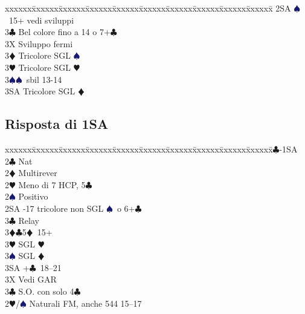 \documentclass[a4paper,italian]{article}
\newcommand{\BC}{\textcolor{OliveGreen}{$\clubsuit$}}
\newcommand{\BD}{\textcolor{RedOrange}{$\vardiamondsuit$}}
\newcommand{\BH}{\textcolor{Red2}{$\varheartsuit${}}}
\newcommand{\BS}{\textcolor{MidnightBlue}{$\spadesuit${}}}
\newenvironment{bidtable}
{\begin{tabbing}

    xxxxxx\=xxxxxx\=xxxxxx\=xxxxxx\=xxxxxx\=xxxxxx\=xxxxxx\=xxxxxx\=xxxxxx\=xxxxxx\=\kill}
{\end{tabbing} }%
\begin{document}
\begin{multicols}{2}
\begin{bidtable}
                                        2SA \BS\ 15+ vedi sviluppi\\
                                        3\BC \> Bel colore fino a 14 o 7+\BC\+\\
                                        3X \> Sviluppo fermi\-\\
                                        3\BD \> Tricolore SGL \BS \\
                                        3\BH \> Tricolore SGL \BH \\
                                        3\BS {}\BS\ sbil 13-14\\
                                        3SA \> Tricolore SGL \BD \-
                                    \end{bidtable}

                                    \subsection{Risposta di 1SA}
                                    \begin{bidtable}
                                        1\BC-1SA\+\\
                                        2\BC \> Nat\\
                                        2\BD \> Multirever\+\\
                                        2\BH \> Meno di 7 HCP, 5\BC \\
                                        2\BS \> Positivo\+\\
                                        2SA -17 tricolore non SGL \BS\ o 6+\BC \+\\
                                        3\BC \> Relay\+\\
                                        3\BD {}\BC5\BD\ 15+\\
                                        3\BH \> SGL \BH \\
                                        3\BS \> SGL \BD \\
                                        3SA +\BC\ 18--21\-\-\\
                                        3X \> Vedi GAR\-\\
                                        3\BC \> S.O. con solo 4\BC\-\\
                                        2\BH/\BS \> Naturali FM, anche 544 15--17\+\\

\end{bidtable}
\end{multicols}
\end{document}
